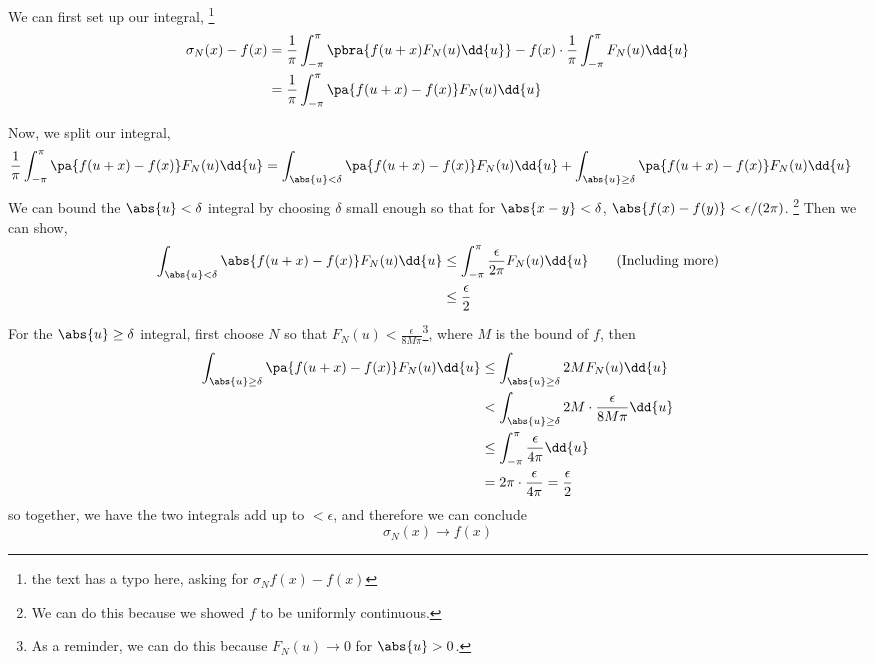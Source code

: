 {{\item We can first set up our integral,
\footnote{the text has a typo here, asking for $\sigma_Nf(x) - f(x)$}
\begin{align*}
  \sigma_N(x) - f(x) 
  &= 
  \frac{1}{\pi}
  \int_{-\pi}^\pi 
  \pbra{
    f(u+x)F_N(u) \dd{u}
  } - f(x) \cdot \frac{1}{\pi}\int_{-\pi}^\pi F_N(u) \dd{u}\\
  &=
  \frac{1}{\pi}
  \int_{-\pi}^\pi 
    \pa{f(u+x) - f(x)}F_N(u) \dd{u}
\end{align*}
}
Now, we split our integral,
\begin{align*}
  \frac{1}{\pi}
  \int_{-\pi}^\pi 
    \pa{f(u+x) - f(x)}F_N(u) \dd{u}
  &= \int_{\abs{u} < \delta}
    \pa{f(u+x) - f(x)}F_N(u) \dd{u} +
  \int_{\abs{u} \geq \delta}
    \pa{f(u+x) - f(x)}F_N(u) \dd{u}
\end{align*}
We can bound the $\abs{u} < \delta$ integral by
choosing $\delta$ small enough so that for $\abs{x - y} < \delta$,
$\abs{f(x) - f(y)} < \epsilon/(2\pi)$.
\footnote{
  We can do this because we showed $f$ to be uniformly continuous.
}
Then we can show,
\begin{align*}
  \int_{\abs{u} < \delta}
    \abs{f(u+x) - f(x)}F_N(u) \dd{u}
  &\leq \int_{-\pi}^\pi
    \frac{\epsilon}{2\pi} F_N(u) \dd{u}\tag{Including more}\\
  &\leq 
  \frac{\epsilon}{2}
\end{align*}
For the $\abs{u} \geq \delta$ integral, 
first choose $N$ so that $F_N(u) < \frac{\epsilon}{8M\pi}$\footnote{
As a reminder, we can do this because $F_N(u) \to 0$ for $\abs{u} > 0$.
},
where $M$ is the bound of $f$, then 
\begin{align*}
  \int_{\abs{u} \geq \delta}
    \pa{f(u+x) - f(x)}F_N(u) \dd{u}
  &\leq
  \int_{\abs{u} \geq \delta}
    2M F_N(u) \dd{u}\\
  &<
  \int_{\abs{u} \geq \delta}
    2M \cdot \frac{\epsilon}{8M\pi} \dd{u}\\
  &\leq
  \int_{-\pi}^\pi
    \frac{\epsilon}{4\pi} \dd{u}\\
  &=
  2\pi \cdot \frac{\epsilon}{4\pi} = \frac{\epsilon}{2}
\end{align*}
so together, we have the two integrals add up to $< \epsilon$,
and therefore we can conclude 
\begin{equation*}
  \sigma_N(x) \to f(x)
\end{equation*}
}

